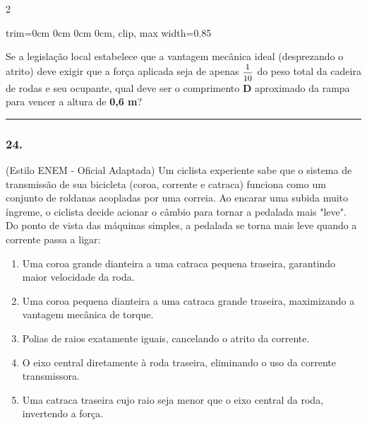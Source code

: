 \documentclass[twoside, 10pt, a4paper]{article}
\newlength{\espacoPreQuestao}
\newlength{\espacoQuestao}
\newlength{\espacoAlt}
\newcommand{\larguraTikz}{0.85\linewidth} %
\begin{document}
\begin{multicols*}{2}
\begin{center}
\begin{adjustbox}{trim=0cm 0cm 0cm 0cm, clip, max width=\larguraTikz}
\end{adjustbox}
\end{center}
Se a legislação local estabelece que a vantagem mecânica ideal (desprezando o atrito) deve exigir que a força aplicada seja de apenas $ \mfrac{1}{10} $ do peso total da cadeira de rodas e seu ocupante, qual deve ser o comprimento \textbf{D} aproximado da rampa para vencer a altura de \textbf{0,6 m}?
\par\vspace{\espacoQuestao}

\noindent\textcolor{CorLinha}{\rule{\linewidth}{0.5pt}} 
\par\vspace{\espacoPreQuestao}
\subsubsection*{24.} (Estilo ENEM - Oficial Adaptada) Um ciclista experiente sabe que o sistema de transmissão de sua bicicleta (coroa, corrente e catraca) funciona como um conjunto de roldanas acopladas por uma correia. Ao encarar uma subida muito íngreme, o ciclista decide acionar o câmbio para tornar a pedalada mais "leve". Do ponto de vista das máquinas simples, a pedalada se torna mais leve quando a corrente passa a ligar:
\begin{enumerate}[label=\alph*), itemsep=\espacoAlt]
    \item Uma coroa grande dianteira a uma catraca pequena traseira, garantindo maior velocidade da roda.
    \item Uma coroa pequena dianteira a uma catraca grande traseira, maximizando a vantagem mecânica de torque.
    \item Polias de raios exatamente iguais, cancelando o atrito da corrente.
    \item O eixo central diretamente à roda traseira, eliminando o uso da corrente transmissora.
    \item Uma catraca traseira cujo raio seja menor que o eixo central da roda, invertendo a força.
\end{enumerate}
\par\vspace{\espacoQuestao}


\end{multicols*}
\end{document}
